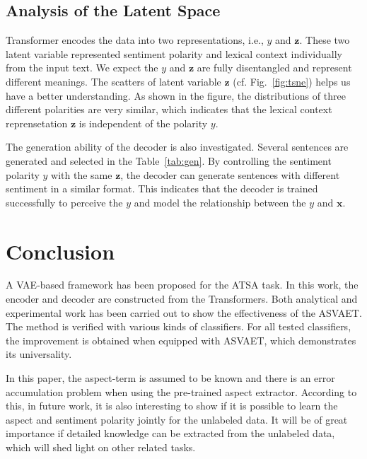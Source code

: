 \documentclass[11pt,a4paper]{article}
\begin{document}
\subsection{Analysis of the Latent Space}
Transformer encodes the data into two representations, i.e., $y$ and $\mathbf{z}$. These two latent variable represented sentiment polarity and lexical context individually from the input text.
We expect the $y$ and $\mathbf{z}$ are fully disentangled and represent different meanings. The scatters of latent variable $\mathbf{z}$ (cf. Fig.~\ref{fig:tsne}) helps us have a better understanding.
As shown in the figure, the distributions of three different polarities are very similar, which indicates that the lexical context reprensetation $\mathbf{z}$ is independent of the polarity $y$.


The generation ability of the decoder is also investigated.
Several sentences are generated and selected in the Table~\ref{tab:gen}.
By controlling the sentiment polarity $y$ with the same $\mathbf{z}$, the decoder can generate sentences with different sentiment in a similar format.
This indicates that the decoder is trained successfully to perceive the $y$ and model the relationship between the $y$ and $\mathbf{x}$.











\section{Conclusion}
A VAE-based framework has been proposed for the ATSA task.
In this work, the encoder and decoder are constructed from the Transformers.  Both analytical and experimental work has been carried out to show the effectiveness of the ASVAET.
The method is verified with various kinds of classifiers.
For all tested classifiers, the improvement is obtained when equipped with ASVAET, which demonstrates its universality.

In this paper, the aspect-term is assumed to be known and there is an error accumulation problem when using the pre-trained aspect extractor. According to this, in future work, it is also interesting to show if it is possible to learn the aspect and sentiment polarity jointly for the unlabeled data. It will be of great importance if detailed knowledge can be extracted from the unlabeled data, which will shed light on other related tasks.



\end{document}

